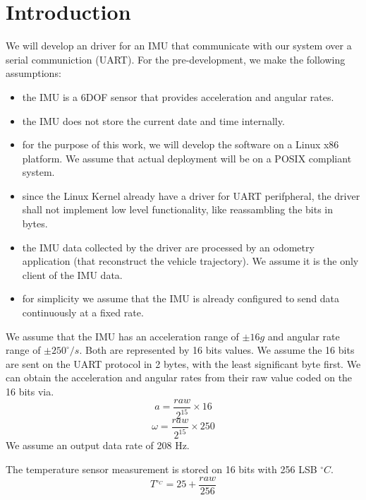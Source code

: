\section{Introduction}
We will develop an driver for an IMU that communicate with our system over a serial communiction (UART).
For the pre-development, we make the following assumptions:
\begin{itemize}
    \item the IMU is a 6DOF sensor that provides acceleration and angular rates.
    \item the IMU does not store the current date and time internally.
    \item for the purpose of this work, we will develop the software on a Linux x86 platform. We assume that actual deployment will be on a POSIX compliant system.
    \item since the Linux Kernel already have a driver for UART perifpheral, the driver shall not implement low level functionality, like reassambling the bits in bytes.
    \item the IMU data collected by the driver are processed by an odometry application (that reconstruct the vehicle trajectory).
    We assume it is the only client of the IMU data.
    \item for simplicity we assume that the IMU is already configured to send data continuously at a fixed rate.
\end{itemize}

We assume that the IMU has an acceleration range of $\pm 16g$ and angular rate range of $\pm 250^{\circ}/s$.
Both are represented by 16 bits values.
We assume the 16 bits are sent on the UART protocol in 2 bytes, with the least significant byte first.
We can obtain the acceleration and angular rates from their raw value coded on the 16 bits via.
\begin{equation}
    a = \frac{raw}{2^{15}} \times 16
\end{equation}
\begin{equation}
    \omega = \frac{raw}{2^{15}} \times 250
\end{equation}
We assume an output data rate of 208 Hz.

The temperature sensor measurement is stored on 16 bits with 256 LSB $^{\circ}C$.
\begin{equation}
    T^{\circ_C} = 25+\frac{raw}{256}
\end{equation}
